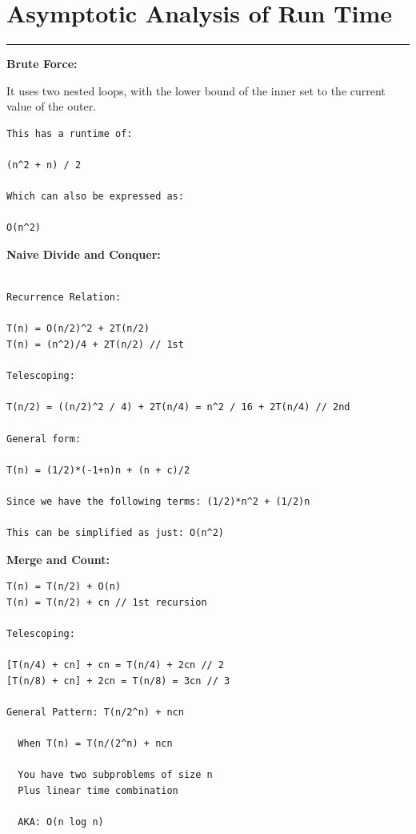 \documentclass[letterpaper,10pt,titlepage,fleqn]{article}
\begin{document}
\section*{Asymptotic Analysis of Run Time}
\hrule
\begin{centering}
\textbf{Brute Force:}
\end{centering}
It uses two nested loops, with the lower bound of the inner set to the current value of the outer. 

\begin{lstlisting}
This has a runtime of: 

(n^2 + n) / 2 

Which can also be expressed as:

O(n^2)
\end{lstlisting}

\begin{centering}
\textbf{Naive Divide and Conquer:}
\end{centering}

\begin{lstlisting}

Recurrence Relation:

T(n) = O(n/2)^2 + 2T(n/2)
T(n) = (n^2)/4 + 2T(n/2) // 1st

Telescoping: 

T(n/2) = ((n/2)^2 / 4) + 2T(n/4) = n^2 / 16 + 2T(n/4) // 2nd

General form:

T(n) = (1/2)*(-1+n)n + (n + c)/2

Since we have the following terms: (1/2)*n^2 + (1/2)n

This can be simplified as just: O(n^2)

\end{lstlisting}

\begin{centering}
\textbf{Merge and Count:}
\end{centering}

\begin{lstlisting}
T(n) = T(n/2) + O(n) 
T(n) = T(n/2) + cn // 1st recursion 

Telescoping:

[T(n/4) + cn] + cn = T(n/4) + 2cn // 2 
[T(n/8) + cn] + 2cn = T(n/8) = 3cn // 3 

General Pattern: T(n/2^n) + ncn

  When T(n) = T(n/(2^n) + ncn

  You have two subproblems of size n
  Plus linear time combination

  AKA: O(n log n)
\end{lstlisting}
\end{document}
